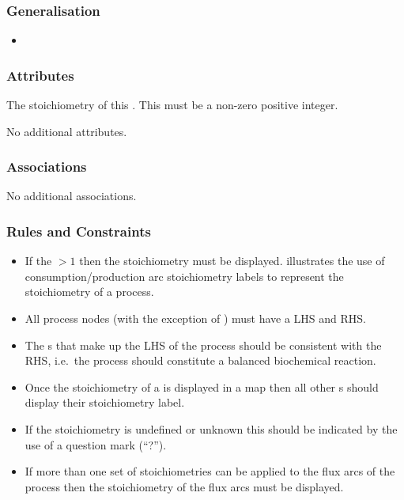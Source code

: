 \subsubsection{Generalisation}

\begin{itemize}
\item {}
\end{itemize}

\subsubsection{Attributes}

\begin{attributes}
   The stoichiometry of this
  . This must be a non-zero positive integer.
\end{attributes}

No additional attributes.

\subsubsection{Associations}

No additional associations.

\subsubsection{Rules and Constraints}

\begin{itemize}
\item If the  $>1$ then the stoichiometry must
  be displayed.  illustrates the use of
  consumption/production arc stoichiometry labels to represent the stoichiometry of a process.
\item All process nodes (with the exception of ) must have a LHS and RHS.
\item The s that make up the LHS of the
  process should be consistent with the RHS, i.e.\, the process should
  constitute a balanced biochemical reaction.
\item Once the stoichiometry of a  is displayed in a map then
  all other s should display their stoichiometry label.
\item If the stoichiometry is undefined or unknown this should be
  indicated by the use of a question mark (``?'').
\item If more than one set of stoichiometries can be applied to the
  flux arcs of the process then the stoichiometry of the flux arcs
  must be displayed.
\end{itemize}


